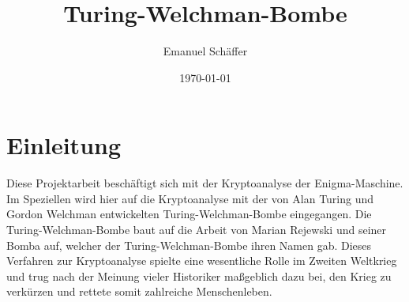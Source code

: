 \documentclass[ngerman, a4paper, footsepline, headsepline]{scrreport}
\begin{document}
	\subject{Kryptoanalyse der Enigma-Maschine durch eine Software-Nachbildung der Turing-Welchman-Bombe}
	\title{Turing-Welchman-Bombe}
	\author{Emanuel Schäffer}
	\date{\today}
	\publishers{RWU--University of Applied Sciences}
	\maketitle
	
	\tableofcontents
	
	
	\chapter{Einleitung}\label{ch:einleitung}
	Diese Projektarbeit beschäftigt sich mit der Kryptoanalyse der Enigma-Maschine.
	Im Speziellen wird hier auf die Kryptoanalyse mit der von Alan Turing und Gordon Welchman entwickelten \glqq Turing-Welchman-Bombe\grqq{} eingegangen.
	Die Turing-Welchman-Bombe baut auf die Arbeit von Marian Rejewski und seiner \glqq Bomba\grqq{} auf, welcher der Turing-Welchman-Bombe ihren Namen gab.
	Dieses Verfahren zur Kryptoanalyse spielte eine wesentliche Rolle im Zweiten Weltkrieg und trug nach der Meinung vieler Historiker maßgeblich dazu bei, den Krieg zu verkürzen und rettete somit zahlreiche Menschenleben.
	
	
	
	
	
	
	
	
	
	
\end{document}
